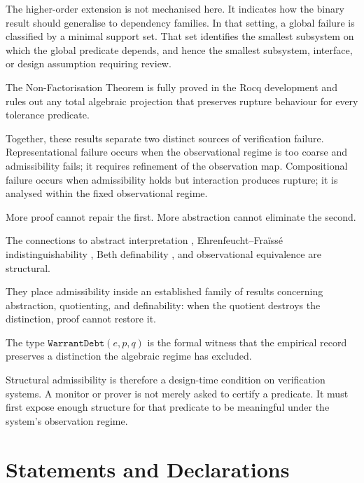 \documentclass[pdflatex,sn-mathphys-num]{sn-jnl}
\theoremstyle{plain}
\theoremstyle{definition}
\theoremstyle{remark}
\begin{document}
The higher-order extension is not mechanised here.
It indicates how the binary result should generalise to dependency
families.
In that setting, a global failure is classified by a minimal support
set.
That set identifies the smallest subsystem on which the global
predicate depends, and hence the smallest subsystem, interface, or
design assumption requiring review.

The Non-Factorisation Theorem is fully proved in the Rocq development
and rules out any total algebraic projection that preserves rupture
behaviour for every tolerance predicate.

Together, these results separate two distinct sources of verification
failure.
Representational failure occurs when the observational regime is too
coarse and admissibility fails; it requires refinement of the
observation map.
Compositional failure occurs when admissibility holds but interaction
produces rupture; it is analysed within the fixed observational regime.

More proof cannot repair the first.
More abstraction cannot eliminate the second.

The connections to abstract interpretation
\cite{cousot1977,cousot1979},
Ehrenfeucht--Fra\"{i}ss\'{e} indistinguishability
\cite{ehrenfeucht1961,libkin2004},
Beth definability
\cite{beth1953,hodges1993},
and observational equivalence
\cite{milner1980,milner1989}
are structural.

They place admissibility inside an established family of results
concerning abstraction, quotienting, and definability: when the
quotient destroys the distinction, proof cannot restore it.

The type $\texttt{WarrantDebt}(e,p,q)$ is the formal witness that the
empirical record preserves a distinction the algebraic regime has
excluded.

Structural admissibility is therefore a design-time condition on
verification systems.
A monitor or prover is not merely asked to certify a predicate.
It must first expose enough structure for that predicate to be
meaningful under the system's observation regime.

\section*{Statements and Declarations}
\end{document}
